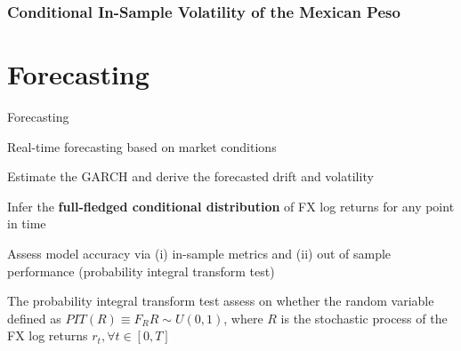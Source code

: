 \documentclass{beamer}
\newenvironment{largeitemize}{\itemize\addtolength{\itemsep}{10pt}}{\enditemize}
\begin{document}
\begin{frame}
\frametitle{Conditional In-Sample Volatility of the Mexican Peso}
\end{frame}

\section{Forecasting}

\begin{frame}{Forecasting}

  \begin{largeitemize}
      \item Real-time forecasting based on market conditions
    \item Estimate the GARCH and derive the forecasted drift and volatility
    \item Infer the \textbf{full-fledged conditional distribution} of FX log returns for any point
      in time
    \item Assess model accuracy via (i) in-sample metrics and (ii) out of
      sample performance (probability integral transform test)
    \item The probability integral transform test assess on whether the random
      variable defined as $PIT(R) \equiv F_{R}R \sim U(0,1)$, where
      $R$ is the stochastic process of the FX log returns $r_t, \forall t \in
      [0, T]$
  \end{largeitemize}
  
\end{frame}
\end{document}
